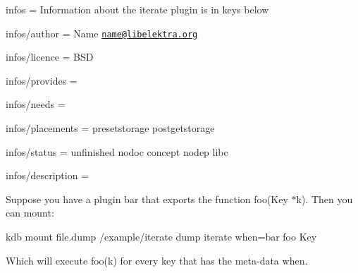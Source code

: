 
\begin{DoxyItemize}
\item infos = Information about the iterate plugin is in keys below
\item infos/author = Name \href{mailto:name@libelektra.org}{\tt name@libelektra.\+org}
\item infos/licence = B\+S\+D
\item infos/provides =
\item infos/needs =
\item infos/placements = presetstorage postgetstorage
\item infos/status = unfinished nodoc concept nodep libc
\item infos/description =
\end{DoxyItemize}

Suppose you have a plugin bar that exports the function {\ttfamily foo(\+Key $\ast$k)}. Then you can mount\+: \begin{DoxyVerb}kdb mount file.dump /example/iterate dump iterate when=bar foo Key
\end{DoxyVerb}


Which will execute {\ttfamily foo(k)} for every key that has the meta-\/data {\ttfamily when}. 